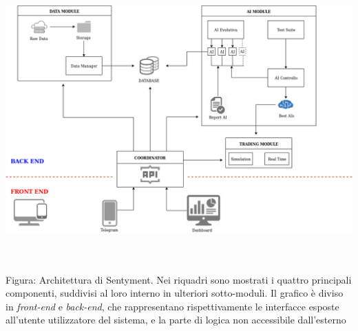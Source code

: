 \documentclass[a4paper,12pt]{report}
\begin{document}
\begin{fig}
	\includegraphics[width=\linewidth]{Sentyment}
	\caption{\\~\\Figura: Architettura di Sentyment. Nei riquadri sono mostrati i quattro principali componenti, suddivisi al loro interno in ulteriori sotto-moduli. Il grafico è diviso in \textit{front-end} e \textit{back-end}, che rappresentano rispettivamente le interfacce esposte all'utente utilizzatore del sistema, e la parte di logica non accessibile dall'esterno}
\end{fig}
\\~\\
\end{document}
